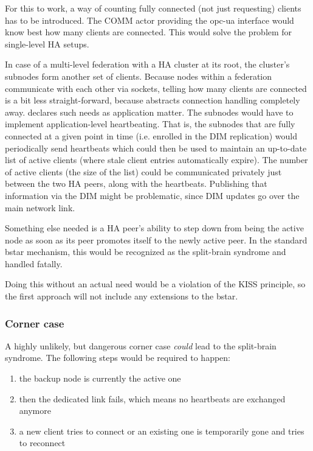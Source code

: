 For this to work, a way of counting fully connected (not just requesting)
clients has to be introduced. The COMM actor providing the \gls{opc-ua}
interface would know best how many clients are connected. This would solve the problem for single-level HA setups.

In case of a multi-level federation with a HA cluster at its root, the
cluster's subnodes form another set of clients. Because nodes within a
federation communicate with each other via \zmq sockets, telling how many
clients are connected is a bit less straight-forward, because \zmq abstracts
connection handling completely away. \zmq declares such needs as application matter.
The subnodes would have to implement application-level heartbeating.
That is, the subnodes that are fully connected at a given point in time (i.e. enrolled
in the DIM replication) would periodically send heartbeats which could then be
used to maintain an up-to-date list of active clients (where stale client
entries automatically expire).  The number of active clients (the size of the
list) could be communicated privately just between the two HA peers, along with
the heartbeats. Publishing that information via the DIM might be problematic,
since DIM updates go over the main network link.

Something else needed is a HA peer's ability to step down from being the
active node as soon as its peer promotes itself to the newly active peer. In
the standard \gls{bstar} mechanism, this would be recognized as the split-brain
syndrome and handled fatally.

Doing this without an actual need would be a violation of the KISS principle,
so the first approach will not include any extensions to the \gls{bstar}.

\subsubsection{Corner case}
A highly unlikely, but dangerous corner case \emph{could} lead to the
split-brain syndrome. The following steps would be required to happen:

\begin{enumerate}
	\item the backup node is currently the active one

	\item then the dedicated link fails, which means no heartbeats are
		exchanged anymore

	\item a new client tries to connect or an existing one is temporarily
		gone and tries to reconnect
\end{enumerate}

